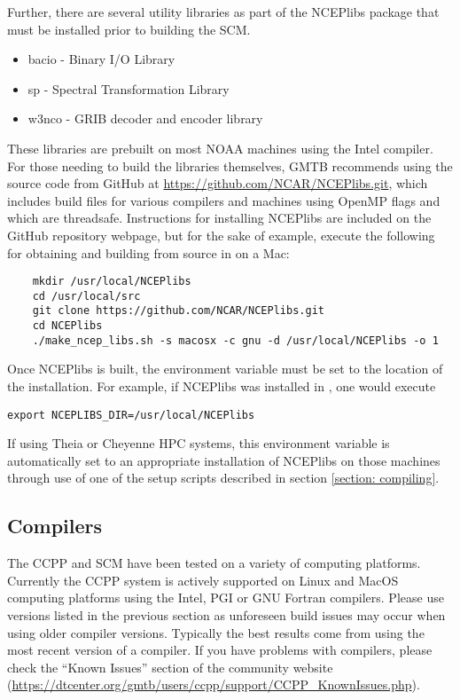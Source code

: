 Further, there are several utility libraries as part of the NCEPlibs package that must be installed prior to building the SCM. 
\begin{itemize}
    \item bacio - Binary I/O Library
    \item sp - Spectral Transformation Library
    \item w3nco - GRIB decoder and encoder library
\end{itemize}
These libraries are prebuilt on most NOAA machines using the Intel compiler. For those needing to build the libraries themselves, GMTB recommends using the source code from GitHub at \url{https://github.com/NCAR/NCEPlibs.git}, which includes build files for various compilers and machines using OpenMP flags and which are threadsafe. Instructions for installing NCEPlibs are included on the GitHub repository webpage, but for the sake of example, execute the following for obtaining and building from source in  on a Mac:
\begin{lstlisting}
    mkdir /usr/local/NCEPlibs
    cd /usr/local/src
    git clone https://github.com/NCAR/NCEPlibs.git
    cd NCEPlibs
    ./make_ncep_libs.sh -s macosx -c gnu -d /usr/local/NCEPlibs -o 1
\end{lstlisting}
Once NCEPlibs is built, the  environment variable must be set to the location of the installation. For example, if NCEPlibs was installed in , one would execute
\begin{lstlisting}
export NCEPLIBS_DIR=/usr/local/NCEPlibs
\end{lstlisting}
If using Theia or Cheyenne HPC systems, this environment variable is automatically set to an appropriate installation of NCEPlibs on those machines through use of one of the setup scripts described in section \ref{section: compiling}.


\subsection{Compilers}
The CCPP and SCM have been tested on a variety of
computing platforms. Currently the CCPP system is actively supported
on Linux and MacOS computing platforms using the Intel, PGI or GNU Fortran
compilers. Please use versions listed in the previous section as unforeseen
build issues may occur when using older compiler versions. Typically the best results come from using the
most recent version of a compiler. If you have problems with compilers, please check the ``Known Issues'' section of the
community website (\url{https://dtcenter.org/gmtb/users/ccpp/support/CCPP_KnownIssues.php}).

